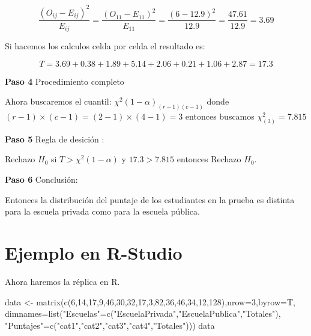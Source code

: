 \documentclass[
  a4paper,
  oneside,
  openany]{book}
\newenvironment{Shaded}{\begin{snugshade}}{\end{snugshade}}
\newcommand{\AttributeTok}[1]{\textcolor[rgb]{0.77,0.63,0.00}{#1}}
\newcommand{\DecValTok}[1]{\textcolor[rgb]{0.00,0.00,0.81}{#1}}
\newcommand{\FunctionTok}[1]{\textcolor[rgb]{0.00,0.00,0.00}{#1}}
\newcommand{\NormalTok}[1]{#1}
\newcommand{\OtherTok}[1]{\textcolor[rgb]{0.56,0.35,0.01}{#1}}
\newcommand{\StringTok}[1]{\textcolor[rgb]{0.31,0.60,0.02}{#1}}
\begin{document}
\[\frac{(O_{ij}-E_{ij})^2}{E_{ij}}= \frac{(O_{11}-E_{11})^2}{E_{11}}=\frac{(6-12.9)^2}{12.9}=\frac{47.61}{12.9}=3.69\]

Si hacemos los calculos celda por celda el resultado es:

\[T=3.69+0.38+1.89+5.14+2.06+0.21+1.06+2.87=17.3\]

\textbf{Paso 4} Procedimiento completo

Ahora buscaremos el cuantil: \(\chi^2(1-\alpha)_{(r-1)(c-1)}\) donde \((r-1)\times(c-1)=(2-1)\times(4-1)=3\)
entonces buscamos \(\chi^2_{(3)}=7.815\)

\textbf{Paso 5} Regla de desición :

Rechazo \(H_0\) si \(T> \chi^2(1-\alpha)\) y \(17.3> 7.815\) entonces Rechazo \(H_0\).

\textbf{Paso 6} Conclusión:

Entonces la distribución del puntaje de los estudiantes en la prueba es distinta para la escuela privada como para la escuela pública.

\hypertarget{ejemplo-en-r-studio-11}{%
\section{Ejemplo en R-Studio}\label{ejemplo-en-r-studio-11}}

Ahora haremos la réplica en R.

\begin{Shaded}
\begin{Highlighting}[]
\NormalTok{data }\OtherTok{\textless{}{-}} \FunctionTok{matrix}\NormalTok{(}\FunctionTok{c}\NormalTok{(}\DecValTok{6}\NormalTok{,}\DecValTok{14}\NormalTok{,}\DecValTok{17}\NormalTok{,}\DecValTok{9}\NormalTok{,}\DecValTok{46}\NormalTok{,}\DecValTok{30}\NormalTok{,}\DecValTok{32}\NormalTok{,}\DecValTok{17}\NormalTok{,}\DecValTok{3}\NormalTok{,}\DecValTok{82}\NormalTok{,}\DecValTok{36}\NormalTok{,}\DecValTok{46}\NormalTok{,}\DecValTok{34}\NormalTok{,}\DecValTok{12}\NormalTok{,}\DecValTok{128}\NormalTok{),}\AttributeTok{nrow=}\DecValTok{3}\NormalTok{,}\AttributeTok{byrow=}\NormalTok{T, }
               \AttributeTok{dimnames=}\FunctionTok{list}\NormalTok{(}\StringTok{"Escuelas"}\OtherTok{=}\FunctionTok{c}\NormalTok{(}\StringTok{"EscuelaPrivada"}\NormalTok{,}\StringTok{"EscuelaPublica"}\NormalTok{,}\StringTok{"Totales"}\NormalTok{), }
                             \StringTok{"Puntajes"}\OtherTok{=}\FunctionTok{c}\NormalTok{(}\StringTok{"cat1"}\NormalTok{,}\StringTok{"cat2"}\NormalTok{,}\StringTok{"cat3"}\NormalTok{,}\StringTok{"cat4"}\NormalTok{,}\StringTok{"Totales"}\NormalTok{)))}
\NormalTok{data}
\end{Highlighting}
\end{Shaded}
\end{document}
